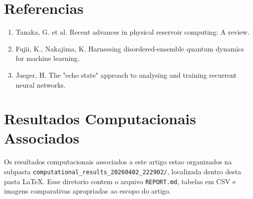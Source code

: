 \documentclass[12pt]{article}
\providecommand{\tightlist}{%
  \setlength{\itemsep}{0pt}\setlength{\parskip}{0pt}}
\begin{document}
\section{Referencias}\label{referencias}

\begin{enumerate}
\def\labelenumi{\arabic{enumi}.}
\tightlist
\item
  Tanaka, G. et al. Recent advances in physical reservoir computing: A review.
\item
  Fujii, K., Nakajima, K. Harnessing disordered-ensemble quantum dynamics for machine learning.
\item
  Jaeger, H. The "echo state" approach to analysing and training recurrent neural networks.
\end{enumerate}

\section*{Resultados Computacionais Associados}

Os resultados computacionais associados a este artigo estao organizados na subpasta \texttt{computational\_results\_20260402\_222902/}, localizada dentro desta pasta \LaTeX. Esse diretorio contem o arquivo \texttt{REPORT.md}, tabelas em CSV e imagens comparativas apropriadas ao escopo do artigo.
\end{document}
